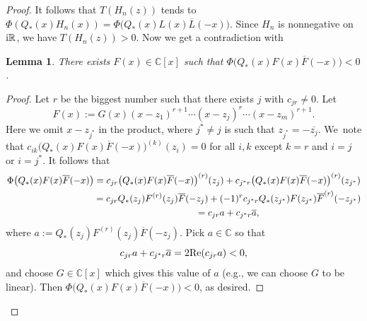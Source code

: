 \documentclass[10pt,a4paper]{amsart}
\newcommand{\RN}{\mathbb{R}} %
\newcommand{\CN}{\mathbb{C}} %
\newcommand{\ovl}{\overline}
\newtheorem{Lemma}[Theorem]{Lemma}
\theoremstyle{definition}
\numberwithin{equation}{section}
\begin{document}
\begin{proof}
It follows that $T(H_n(z))$ tends to $\Phi(Q_*(x)H_n(x))=\Phi\big(Q_*(x)L(x)\ovl{L}(-x)\big)$. Since $H_n$ is nonnegative on ${\rm i}\RN$, we have $T(H_n(z))>0$. Now we get a contradiction with
\begin{Lemma}
There exists $F(x)\in\CN[x]$ such that $\Phi\big(Q_*(x)F(x)\ovl{F}(-x)\big)<0$.
\end{Lemma}
\begin{proof}
Let $r$ be the biggest number such that there exists $j$ with $c_{jr}\neq 0$. Let
\[
F(x):=G(x)(x-z_1)^{r+1}\cdots(x-z_j)^{r}\cdots (x-z_m)^{r+1}.
\]
Here we omit $x-z_{{j^*}}$ in the product, where ${j^*}\ne j$ is such that $z_{{j^*}}=-\ovl{z_j}$. We~note that $c_{ik} \big(Q_*(x)F(x)\ovl{F}(-x)\big)^{(k)}(z_i)=0$ for all $i,k$ except $k=r$ and $i=j$ or $i={j^*}$. It follows that
\begin{gather*}
\Phi\big(Q_*(x)F(x)\ovl{F}(-x)\big)=
c_{jr}\big(Q_*(x)F(x)\ovl{F}(-x)\big)^{(r)}(z_j)+c_{{j^*}r} \big(Q_*(x)F(x)\ovl{F}(-x)\big)^{(r)}(z_{{j^*}})
\\ \hphantom{\Phi\big(Q_*(x)F(x)\ovl{F}(-x)\big)}
{}=c_{jr} Q_*(z_j)F^{(r)}(z_j)\ovl{F}(-z_j)+(-1)^r c_{{j^*}r}Q_*(z_{{j^*}})F(z_{{j^*}})\ovl{F}^{(r)}(-z_{{j^*}})
\\ \hphantom{\Phi\big(Q_*(x)F(x)\ovl{F}(-x)\big)}
{}=c_{jr}a+c_{{j^*}r}\ovl a,
\end{gather*}
where $a:= Q_*(z_{j})F^{(r)}(z_{j})\ovl{F}(-z_{j})$. Pick $a\in \mathbb C$ so that
\[
c_{jr}a+c_{{j^*}r}\ovl a=2{\rm Re}(c_{jr}a)<0,
\]
and choose
$G\in \CN[x]$ which gives this value of $a$ (e.g., we can choose $G$ to be linear).
Then $\Phi\big(Q_*(x)F(x)\ovl{F}(-x)\big)<0$, as desired.
\end{proof}
\renewcommand{\qed}{}
\end{proof}
\end{document}
